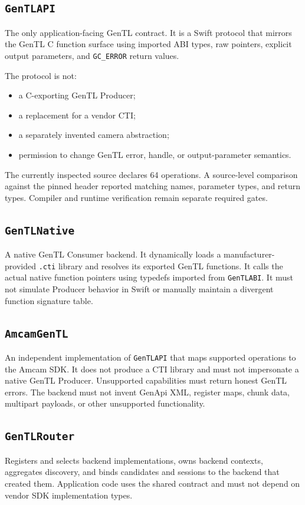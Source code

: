 \documentclass[11pt,a4paper]{report}
\begin{document}
\subsection{\texttt{GenTLAPI}}
The only application-facing GenTL contract. It is a Swift protocol that mirrors the GenTL C function surface using imported ABI types, raw pointers, explicit output parameters, and \texttt{GC\_ERROR} return values.

The protocol is not:
\begin{itemize}
  \item a C-exporting GenTL Producer;
  \item a replacement for a vendor CTI;
  \item a separately invented camera abstraction;
  \item permission to change GenTL error, handle, or output-parameter semantics.
\end{itemize}

The currently inspected source declares 64 operations. A source-level comparison against the pinned header reported matching names, parameter types, and return types. Compiler and runtime verification remain separate required gates.

\subsection{\texttt{GenTLNative}}
A native GenTL Consumer backend. It dynamically loads a manufacturer-provided \texttt{.cti} library and resolves its exported GenTL functions. It calls the actual native function pointers using typedefs imported from \texttt{GenTLABI}. It must not simulate Producer behavior in Swift or manually maintain a divergent function signature table.

\subsection{\texttt{AmcamGenTL}}
An independent implementation of \texttt{GenTLAPI} that maps supported operations to the Amcam SDK. It does not produce a CTI library and must not impersonate a native GenTL Producer. Unsupported capabilities must return honest GenTL errors. The backend must not invent GenApi XML, register maps, chunk data, multipart payloads, or other unsupported functionality.

\subsection{\texttt{GenTLRouter}}
Registers and selects backend implementations, owns backend contexts, aggregates discovery, and binds candidates and sessions to the backend that created them. Application code uses the shared contract and must not depend on vendor SDK implementation types.
\end{document}
